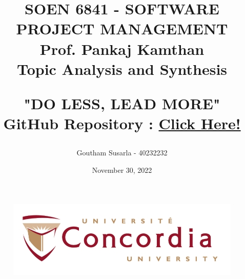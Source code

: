 \documentclass[10pt]{article}
\begin{document}
\begin{figure}
    \centering
    \includegraphics[width=1.0\linewidth]{logo.png}
    
    \label{fig:enter-label}
\end{figure}

\title{
\vspace{\baselineskip}
SOEN 6841 - SOFTWARE PROJECT MANAGEMENT\\

\vspace{\baselineskip}
Prof. Pankaj Kamthan
\vspace{\baselineskip}
\\ Topic Analysis and Synthesis \\
\vspace{\baselineskip}

"DO LESS, LEAD MORE" \\
\vspace{\baselineskip}
GitHub Repository : \href{https://github.com/Gouthamsusarla/TAS-SOEN-6841}{Click Here!}

\vspace{\baselineskip}
}

\author{Goutham Susarla - 40232232}

\date{November 30, 2022}

\maketitle

\newpage
\end{document}
